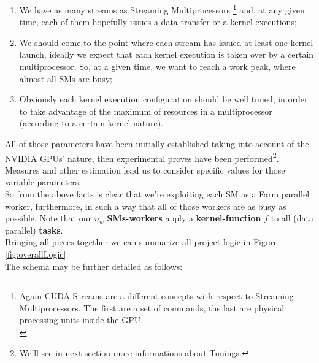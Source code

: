	\begin{enumerate}
		\item We have as many streams as Streaming Multiprocessors \footnote{Again CUDA Streams are a different concepts with respect to Streaming Multiprocessors. The first are a set of commands, the last are physical processing units inside the GPU.\\} and, at any given time, each of them hopefully issues a data transfer or a kernel executions;
		\item We should come to the point where each stream has issued at least one kernel launch, ideally we expect that each kernel execution is taken over by a certain multiprocessor. So, at a given time, we want to reach a work peak, where almost all SMs are busy;
		\item Obviously each kernel execution configuration should be well tuned, in order to take advantage of the maximum of resources in a multiprocessor (according to a certain kernel nature). 
	\end{enumerate}
	

	All of those parameters have been initially established taking into account of the NVIDIA GPUs' nature, then experimental proves have been performed\footnote{We'll see in next section more informations about Tunings.}. Measures and other estimation lead us to consider specific values for those variable parameters.\\
	So from the above facts is clear that we're exploiting each SM as a Farm parallel worker, furthermore, in such a way that all of those workers are as busy as possible. Note that our \(n_w\) \textbf{SMs-workers} apply a \textbf{kernel-function} \(f\) to all (data parallel) \textbf{tasks}.\\
	Bringing all pieces together we can summarize all project logic in Figure \ref{fig:overallLogic}.\\
	The schema may be further detailed as follows:
					
